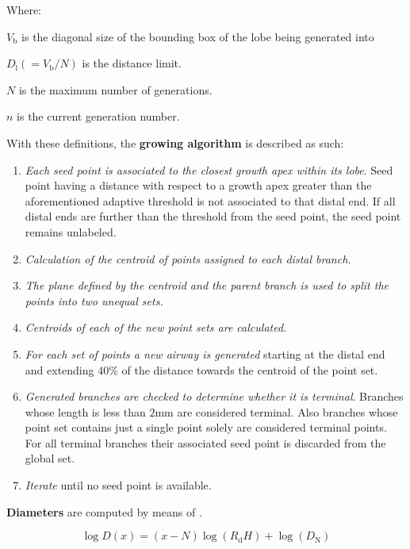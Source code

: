 Where:
\begin{description}
\item $V_{\text{b}}$ is the diagonal size of the bounding box of the lobe being
  generated into
\item $D_{\text{l}} (= {V_{\text{b}}/{N}})$ is the distance limit.
\item $N$ is the maximum number of generations.
\item $n$ is the current generation number.
\end{description}

With these definitions, the \textbf{growing algorithm} is described as
such:

\begin{enumerate}
\item \emph{Each seed point is associated to the closest growth apex
    within its lobe}.  Seed point having a distance with respect to a
  growth apex greater than the aforementioned adaptive threshold is
  not associated to that distal end.  If all distal ends are further
  than the threshold from the seed point, the seed point remains
  unlabeled.
\item \emph{Calculation of the centroid of points assigned to each
    distal branch.}
\item \emph{The plane defined by the centroid and the parent branch is
    used to split the points into two unequal sets.}
\item \emph{Centroids of each of the new point sets are calculated.}
\item \emph{For each set of points a new airway is generated} starting
  at the distal end and extending 40\% of the distance towards the
  centroid of the point set.
\item \emph{Generated branches are checked to determine whether it is
    terminal}.  Branches whose length is less than $2\text{mm}$ are
  considered terminal.  Also branches whose point set contains just a
  single point solely are considered terminal points.  For all
  terminal branches their associated seed point is discarded from the
  global set.
\item \emph{Iterate} until no seed point is available.
\end{enumerate}

\textbf{Diameters} are computed by means of .

\begin{equation}
  \log D(x) = (x - N)\log(R_{\text{d}} H) + \log(D_{\text{N}})
  \label{eq:lumen_diameter}
\end{equation}

